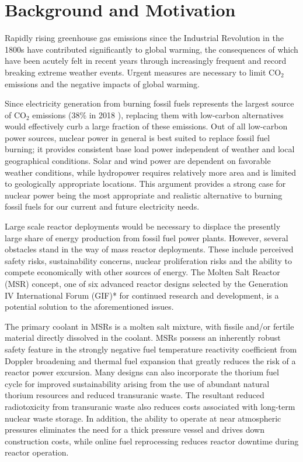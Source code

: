 \section{Background and Motivation}

Rapidly rising greenhouse gas emissions since the Industrial Revolution in the
1800s have contributed significantly to global warming, the consequences of
which have been acutely felt in recent years through increasingly frequent and
record breaking extreme weather events. Urgent measures are necessary to limit
CO$_2$ emissions and the negative impacts of global warming.

Since electricity generation from burning fossil fuels represents the
largest source of CO$_2$ emissions (38\% in 2018 \cite{iea_global_2019}), replacing them with
low-carbon
alternatives would effectively curb a large fraction of these emissions. Out
of all low-carbon power sources, nuclear power in general is best suited to
replace fossil fuel burning; it provides consistent base load
power independent of weather and local geographical conditions. Solar and wind
power are dependent on favorable weather conditions, while hydropower requires
relatively more area and is limited
to geologically appropriate locations. This argument
provides a strong case for nuclear power being the most appropriate and
realistic alternative to burning fossil fuels for our current and future
electricity needs.

Large scale reactor deployments would be necessary to displace the
presently large share of energy production from fossil fuel power plants.
However, several obstacles stand in the way of mass reactor deployments. These
include perceived safety risks, sustainability concerns, nuclear proliferation
risks and the ability to compete economically with other sources of energy.
The Molten Salt Reactor (MSR) concept, one of six advanced reactor designs
selected by the Generation IV International Forum
(GIF)* for continued research and development, is a potential solution to the
aforementioned issues.

The primary coolant in MSRs is a molten salt mixture,
with fissile and/or fertile material directly dissolved in the coolant.
MSRs possess an inherently robust safety feature in the
strongly negative fuel temperature reactivity coefficient from Doppler
broadening and thermal fuel expansion that greatly reduces
the risk of a reactor power excursion. Many designs can also incorporate the
thorium fuel cycle for improved sustainability arising from the use of abundant
natural thorium resources and reduced transuranic waste. The resultant reduced
radiotoxicity from transuranic waste also reduces costs associated with
long-term nuclear waste storage.
In addition, the ability to operate at near atmospheric pressures eliminates
the need for a thick pressure vessel and drives down construction
costs, while online fuel reprocessing reduces reactor downtime during reactor
operation.

